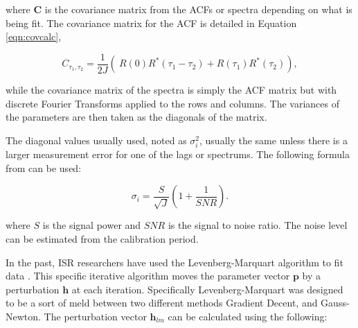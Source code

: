 \noindent where $ \mathbf{C}$ is the covariance matrix from the ACFs or spectra depending on what is being fit. The covariance matrix for the ACF is detailed in Equation \ref{eqn:covcalc}, 

\begin{equation}
\label{eqn:covcalc}
C_{\tau_1,\tau_2} = \frac{1}{2J} \left( \ R(0)  R^*(\tau_1-\tau_2) +  R(\tau_1) R^*(\tau_2) \right),
\end{equation}

\noindent while the covariance matrix of the spectra is simply the ACF matrix but with discrete Fourier Transforms applied to the rows and columns. The variances of the parameters are then taken as the diagonals of the matrix.


%
%



The diagonal values usually used, noted as $\sigma_i^2$, usually the same unless there is a larger measurement error for one of the lags or spectrums.  The following formula from  \cite{nicollsisrschool2013} can be used:

\begin{equation}
\label{sigpow}
\sigma_i = \frac{S}{\sqrt{J}}\left(1+\frac{1}{SNR}\right).
\end{equation}

\noindent where $S$ is the signal power and $SNR$ is the signal to noise ratio. The noise level can be estimated from the calibration period. 

In the past, ISR researchers have used the Levenberg-Marquart algorithm to fit data \cite{nikoukar2008}. This specific iterative algorithm moves the parameter vector $\mathbf{p}$ by a perturbation $\mathbf{h}$ at each iteration\cite{gavin:2013}. Specifically Levenberg-Marquart was designed to be a sort of meld between two different methods Gradient Decent, and Gauss-Newton. The perturbation vector $\mathbf{h}_{lm}$ can be calculated using the following:

